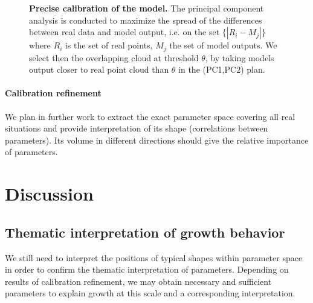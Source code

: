 \documentclass[10pt,letterpaper]{article}
\begin{document}
\begin{figure}
\caption[Precise calibration of the model]{\textbf{Precise calibration of the model.} The principal component analysis is conducted to maximize the spread of the differences between real data and model output, i.e. on the set $\{\left|R_i - M_j\right|\}$ where $R_i$ is the set of real points, $M_j$ the set of model outputs. We select then the overlapping cloud at threshold $\theta$, by taking models output closer to real point cloud than $\theta$ in the (PC1,PC2) plan.}
\label{fig:densitycalib}
\end{figure}





\paragraph{Calibration refinement}

We plan in further work to extract the exact parameter space covering all real situations and provide interpretation of its shape (correlations between parameters). Its volume in different directions should give the relative importance of parameters.





\section*{Discussion}


\subsection*{Thematic interpretation of growth behavior}

We still need to interpret the positions of typical shapes within parameter space in order to confirm the thematic interpretation of parameters. Depending on results of calibration refinement, we may obtain necessary and sufficient parameters to explain growth at this scale and a corresponding interpretation.
\end{document}
